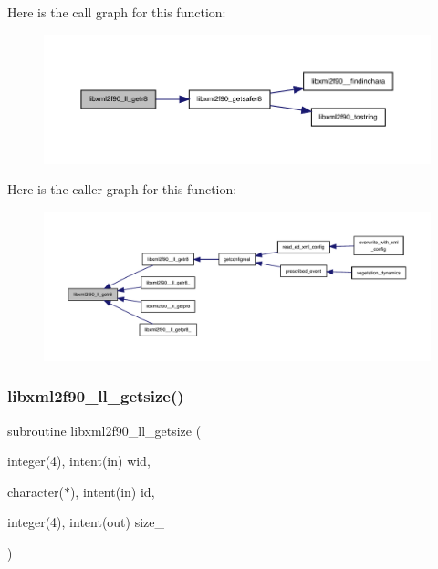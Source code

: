 Here is the call graph for this function\+:
\nopagebreak
\begin{figure}[H]
\begin{center}
\leavevmode
\includegraphics[width=350pt]{libxml2f90_8f90__pp_8f90_abf76069613613425c0bc9539a51cd4d9_cgraph}
\end{center}
\end{figure}
Here is the caller graph for this function\+:
\nopagebreak
\begin{figure}[H]
\begin{center}
\leavevmode
\includegraphics[width=350pt]{libxml2f90_8f90__pp_8f90_abf76069613613425c0bc9539a51cd4d9_icgraph}
\end{center}
\end{figure}
\mbox{\label{libxml2f90_8f90__pp_8f90_acfe9271d1d35656ab0b7c9ab2d303476}} 
\subsubsection{\texorpdfstring{libxml2f90\+\_\+ll\+\_\+getsize()}{libxml2f90\_ll\_getsize()}}
{\footnotesize\ttfamily subroutine libxml2f90\+\_\+ll\+\_\+getsize (\begin{DoxyParamCaption}\item[{integer(4), intent(in)}]{wid,  }\item[{character($\ast$), intent(in)}]{id,  }\item[{integer(4), intent(out)}]{size\+\_\+ }\end{DoxyParamCaption})}

